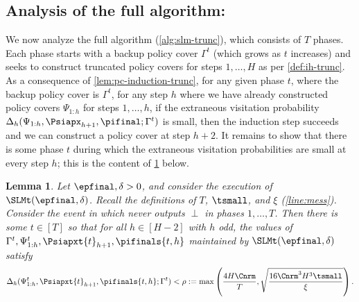 \documentclass[11pt, oneside]{article}
\theoremstyle{plain}
\newtheorem{lemma}[theorem]{Lemma}
\theoremstyle{definition}
\numberwithin{theorem}{section}
\renewcommand{\^}[1]{^{(#1)}}
\begin{document}
\subsection{Analysis of the full algorithm: \SLMt}
\label{sec:slmt-analysis}
We now analyze the full algorithm \SLMt{} (\cref{alg:slm-trunc}), which consists of $T$ phases. Each phase starts with a backup policy cover $\Gamma^t$ (which grows as $t$ increases) and seeks to construct truncated policy covers for steps $1,\dots,H$ as per \cref{def:ih-trunc}. As a consequence of \cref{lem:pc-induction-trunc}, for any given phase $t$, where the backup policy cover is $\Gamma^t$, for any step $h$ where we have already constructed policy covers $\Psi_{1:h}$ for steps $1,\dots,h$, if the extraneous visitation probability $\Delta_h(\Psi_{1:h},\Psiapx_{h+1},\pifinal;\Gamma^t)$ is small, then the induction step succeeds and we can construct a policy cover at step $h+2$. It remains to show that there is some phase $t$ during which the extraneous visitation probabilities are small at every step $h$; this is the content of \cref{lem:gamma-stop} below.
  \begin{lemma}
    \label{lem:gamma-stop}
Let $\epfinal,\delta>0$, and consider the execution of $\SLMt(\epfinal,\delta)$. Recall the definitions of $T$, $\tsmall$, and $\xi$ (\cref{line:mess}). Consider the event in which \ESCt never outputs $\perp$ in phases $1,\dots,T$. Then there is some $t \in [T]$ so that for all $h \in [H-2]$ with $h$ odd, the values of $\Gamma^t, \Psi_{1:h}^t, \Psiapxt{t}_{h+1}, \pifinals{t,h}$ maintained by $\SLMt(\epfinal,\delta)$ satisfy 
\[\Delta_h(\Psi_{1:h}^t, \Psiapxt{t}_{h+1}, \pifinals{t,h}; \Gamma^t) < \rho := \max\left(\frac{4H\Cnrm}{T}, \sqrt{\frac{16\Cnrm^3 H^3 \tsmall}{\xi}}\right).\] 
\end{lemma}
\end{document}
